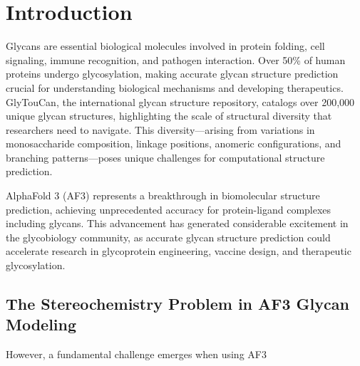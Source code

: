 \documentclass[11pt,a4paper]{article}
\begin{document}
\section{Introduction}

Glycans are essential biological molecules involved in protein folding, cell signaling, immune recognition, and pathogen interaction. Over 50\% of human proteins undergo glycosylation, making accurate glycan structure prediction crucial for understanding biological mechanisms and developing therapeutics. GlyTouCan, the international glycan structure repository, catalogs over 200,000 unique glycan structures, highlighting the scale of structural diversity that researchers need to navigate. This diversity---arising from variations in monosaccharide composition, linkage positions, anomeric configurations, and branching patterns---poses unique challenges for computational structure prediction.

AlphaFold 3 (AF3) represents a breakthrough in biomolecular structure prediction, achieving unprecedented accuracy for protein-ligand complexes including glycans. This advancement has generated considerable excitement in the glycobiology community, as accurate glycan structure prediction could accelerate research in glycoprotein engineering, vaccine design, and therapeutic glycosylation.

\subsection{The Stereochemistry Problem in AF3 Glycan Modeling}

However, a fundamental challenge emerges when using AF3
\end{document}
